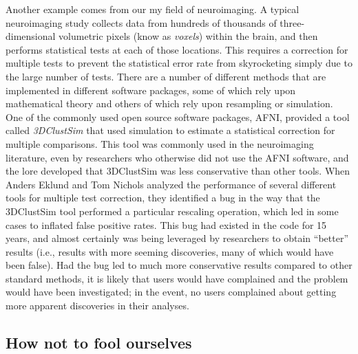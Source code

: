 Another example comes from our my field of neuroimaging.
A typical neuroimaging study collects data from hundreds of thousands of three-dimensional volumetric pixels (know as \textit{voxels}) within the brain, and then performs statistical tests at each of those locations.
This requires a correction for multiple tests to prevent the statistical error rate from skyrocketing simply due to the large number of tests.
There are a number of different methods that are implemented in different software packages, some of which rely upon mathematical theory and others of which rely upon resampling or simulation.
One of the commonly used open source software packages, AFNI, provided a tool called \textit{3DClustSim} that used simulation to estimate a statistical correction for multiple comparisons.
This tool was commonly used in the neuroimaging literature, even by researchers who otherwise did not use the AFNI software, and the lore developed that 3DClustSim was less conservative than other tools.
When Anders Eklund and Tom Nichols \citep{Eklund:2016aa} analyzed the performance of several different tools for multiple test correction, they identified a bug in the way that the 3DClustSim tool performed a particular rescaling operation, which led in some cases to inflated false positive rates.
This bug had existed in the code for 15 years, and almost certainly was being leveraged by researchers to obtain ``better'' results (i.e., results with more seeming discoveries, many of which would have been false).
Had the bug led to much more conservative results compared to other standard methods, it is likely that users would have complained and the problem would have been investigated; in the event, no users complained about getting more apparent discoveries in their analyses.

\subsection{How not to fool ourselves}

